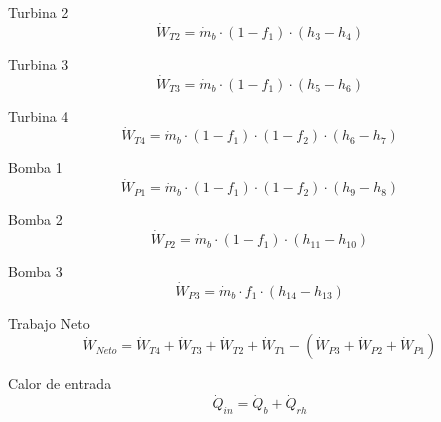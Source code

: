 \documentclass[10pt,fleqn]{article}
\theoremstyle{mytheoremstyle}
\theoremstyle{mytheoremstyle}
\theoremstyle{myproblemstyle}
\begin{document}
\vspace{0.10in}
\noindent
{\color{blue} \rm Turbina 2}
\begin{equation}
\label{EES Eqn:79}
\dot {W}_{T2}=\dot {m}_{b}\cdot  \left( 1-f_{1} \right) \cdot  \left( h_{3}-h_{4} \right)  
\end{equation}

\vspace{0.10in}
\noindent
{\color{blue} \rm Turbina 3}
\begin{equation}
\label{EES Eqn:80}
\dot {W}_{T3}=\dot {m}_{b}\cdot  \left( 1-f_{1} \right) \cdot  \left( h_{5}-h_{6} \right)  
\end{equation}

\vspace{0.10in}
\noindent
{\color{blue} \rm Turbina 4}
\begin{equation}
\label{EES Eqn:81}
\dot {W}_{T4}=\dot {m}_{b}\cdot  \left( 1-f_{1} \right) \cdot  \left( 1-f_{2} \right) \cdot  \left( h_{6}-h_{7} \right)  
\end{equation}

\vspace{0.10in}
\noindent
{\color{blue} \rm Bomba 1}
\begin{equation}
\label{EES Eqn:82}
\dot {W}_{P1}=\dot {m}_{b}\cdot  \left( 1-f_{1} \right) \cdot  \left( 1-f_{2} \right) \cdot  \left( h_{9}-h_{8} \right)  
\end{equation}

\vspace{0.10in}
\noindent
{\color{blue} \rm Bomba 2}
\begin{equation}
\label{EES Eqn:83}
\dot {W}_{P2}=\dot {m}_{b}\cdot  \left( 1-f_{1} \right) \cdot  \left( h_{11}-h_{10} \right)  
\end{equation}

\vspace{0.10in}
\noindent
{\color{blue} \rm Bomba 3}
\begin{equation}
\label{EES Eqn:84}
\dot {W}_{P3}=\dot {m}_{b}\cdot f_{1}\cdot  \left( h_{14}-h_{13} \right)  
\end{equation}

\vspace{0.10in}
\noindent
{\color{blue} \rm Trabajo Neto}
\begin{equation}
\label{EES Eqn:85}
\dot {W}_{Neto}= \dot {W}_{T4}+\dot {W}_{T3}+\dot {W}_{T2}+\dot {W}_{T1}- \left( \dot {W}_{P3}+\dot {W}_{P2}+\dot {W}_{P1} \right)  
\end{equation}

\vspace{0.10in}
\noindent
{\color{blue} \rm Calor de entrada}
\begin{equation}
\label{EES Eqn:86}
\dot {Q}_{in}=\dot {Q}_{b}+\dot {Q}_{rh} 
\end{equation}
\end{document}
